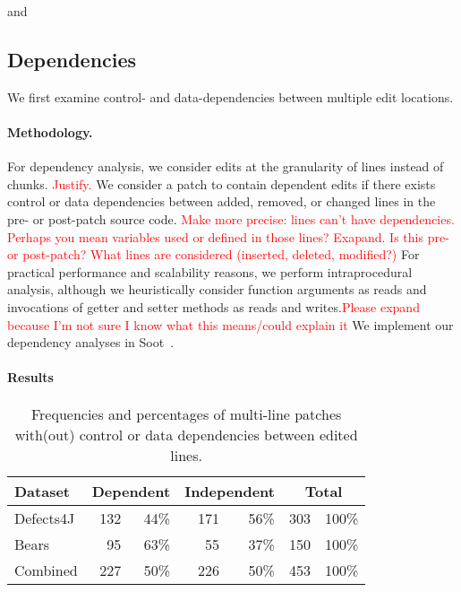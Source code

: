 \documentclass[sigconf, timestamp-false, anonymous=true]{acmart}
\newcommand\todo[1]{\textcolor{red}{#1}}
\begin{document}

and




\subsection{Dependencies}

We first examine control- and data-dependencies between multiple edit locations. 

\paragraph{Methodology.} For dependency analysis, we consider edits at the granularity of lines instead 
of chunks. \todo{Justify.} We consider a patch to contain
dependent edits if there exists control or data dependencies 
between added, removed, or changed lines in the pre- or post-patch
source code. \todo{Make more precise: lines can't have dependencies.  Perhaps
  you mean variables used or defined in those lines?  Exapand.  Is this pre- or
  post-patch?  What lines are considered (inserted, deleted, modified?)} For
practical performance and scalability 
reasons, we perform intraprocedural analysis, 
although we heuristically consider function arguments as reads 
and invocations of getter and setter methods as reads and writes.\todo{Please
  expand because I'm not sure I know what this means/could explain it}
We implement our dependency analyses in Soot~\cite{soot}.

\paragraph{Results}

\begin{table}
{\begin{center}
	\begin{tabular}{l | rr | rr | rr}
		\toprule
		Dataset & \multicolumn{2}{c}{Dependent} & \multicolumn{2}{c}{Independent} & \multicolumn{2}{c}{Total}  \\
		\midrule
		Defects4J & 132  & 44\% & 171 & 56\% & 303 & 100\% \\
		Bears & 95 & 63\% & 55 & 37\% & 150 & 100\% \\
		Combined & 227 & 50\% & 226 & 50\% & 453 & 100\% \\
		\bottomrule
	\end{tabular}
 \end{center}
}
	\caption{Frequencies and percentages of multi-line patches with(out) control or data 
	dependencies between edited lines.}
	\label{tab:dependency}
\end{table}
\end{document}
